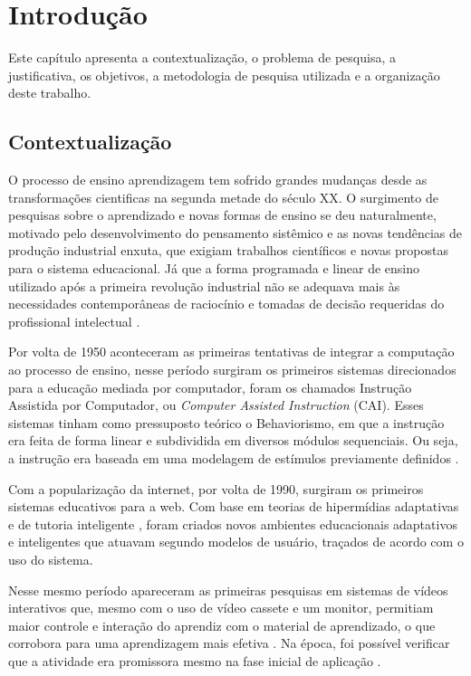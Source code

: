 \chapter[Introdução]{Introdução}

Este capítulo apresenta a contextualização, o problema de pesquisa, a justificativa, 
os objetivos, a metodologia de pesquisa utilizada e a organização deste trabalho.

\section[Contextualização]{Contextualização}

O processo de ensino aprendizagem tem sofrido grandes mudanças desde as transformações cientificas na segunda metade do século XX. O surgimento de pesquisas sobre o aprendizado e novas formas de ensino se deu naturalmente, motivado pelo desenvolvimento do pensamento sistêmico e as novas tendências de produção industrial enxuta, que exigiam trabalhos científicos e novas propostas para o sistema educacional. Já que a forma programada e linear de ensino utilizado após a primeira revolução industrial não se adequava mais às necessidades contemporâneas de raciocínio e tomadas de decisão requeridas do profissional intelectual \cite{oliveira2009, frigotto1989}.

Por volta de 1950 aconteceram as primeiras tentativas de integrar a computação ao processo de ensino, nesse período surgiram os primeiros sistemas direcionados para a educação mediada por computador, foram os chamados Instrução Assistida por Computador, ou \textit{Computer Assisted Instruction} (CAI). Esses sistemas tinham como pressuposto teórico o Behaviorismo, em que a instrução era feita de forma linear e subdividida em diversos módulos sequenciais. Ou seja, a instrução era baseada em uma modelagem de estímulos previamente definidos \cite{giraffa1995,vicari2003}. 

Com a popularização da internet, por volta de 1990, surgiram os primeiros sistemas educativos para a web. Com base em teorias de hipermídias adaptativas \cite{brusilovsky1996} e de tutoria inteligente \cite{brusilovsky1994}, foram criados novos ambientes educacionais adaptativos e inteligentes que atuavam segundo modelos de usuário, traçados de acordo com o uso do sistema.

Nesse mesmo período apareceram as primeiras pesquisas em sistemas de vídeos interativos que, mesmo com o uso de vídeo cassete e um monitor, permitiam maior controle e interação do aprendiz com o material de aprendizado, o que corrobora para uma aprendizagem mais efetiva \cite{zhang2005}. Na época, foi possível verificar que a atividade era promissora mesmo na fase inicial de aplicação \cite{gaudreau1984}.

